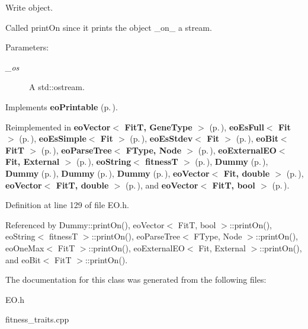 Write object. 

Called print\-On since it prints the object \_\-on\_\- a stream. \begin{Desc}
\item[Parameters:]
\begin{description}
\item[{\em \_\-os}]A std::ostream. \end{description}
\end{Desc}


Implements {\bf eo\-Printable} {\rm (p.\,\pageref{classeo_printable_a1})}.

Reimplemented in {\bf eo\-Vector$<$ Fit\-T, Gene\-Type $>$} {\rm (p.\,\pageref{classeo_vector_a4})}, {\bf eo\-Es\-Full$<$ Fit $>$} {\rm (p.\,\pageref{classeo_es_full_a2})}, {\bf eo\-Es\-Simple$<$ Fit $>$} {\rm (p.\,\pageref{classeo_es_simple_a2})}, {\bf eo\-Es\-Stdev$<$ Fit $>$} {\rm (p.\,\pageref{classeo_es_stdev_a2})}, {\bf eo\-Bit$<$ Fit\-T $>$} {\rm (p.\,\pageref{classeo_bit_a2})}, {\bf eo\-Parse\-Tree$<$ FType, Node $>$} {\rm (p.\,\pageref{classeo_parse_tree_a5})}, {\bf eo\-External\-EO$<$ Fit, External $>$} {\rm (p.\,\pageref{classeo_external_e_o_a4})}, {\bf eo\-String$<$ fitness\-T $>$} {\rm (p.\,\pageref{classeo_string_z24_1})}, {\bf Dummy} {\rm (p.\,\pageref{struct_dummy_a1})}, {\bf Dummy} {\rm (p.\,\pageref{struct_dummy_a2})}, {\bf Dummy} {\rm (p.\,\pageref{struct_dummy_a3})}, {\bf Dummy} {\rm (p.\,\pageref{struct_dummy_a4})}, {\bf eo\-Vector$<$ Fit, double $>$} {\rm (p.\,\pageref{classeo_vector_a4})}, {\bf eo\-Vector$<$ Fit\-T, double $>$} {\rm (p.\,\pageref{classeo_vector_a4})}, and {\bf eo\-Vector$<$ Fit\-T, bool $>$} {\rm (p.\,\pageref{classeo_vector_a4})}.

Definition at line 129 of file EO.h.

Referenced by Dummy::print\-On(), eo\-Vector$<$ Fit\-T, bool $>$::print\-On(), eo\-String$<$ fitness\-T $>$::print\-On(), eo\-Parse\-Tree$<$ FType, Node $>$::print\-On(), eo\-One\-Max$<$ Fit\-T $>$::print\-On(), eo\-External\-EO$<$ Fit, External $>$::print\-On(), and eo\-Bit$<$ Fit\-T $>$::print\-On().

The documentation for this class was generated from the following files:\begin{CompactItemize}
\item 
EO.h\item 
fitness\_\-traits.cpp\end{CompactItemize}

